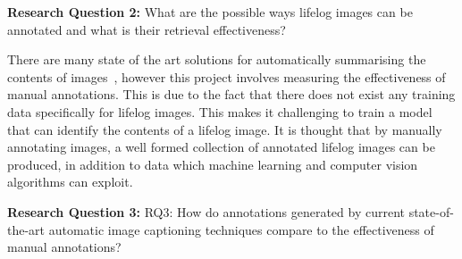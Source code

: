 \textbf{Research Question 2:} What are the possible ways lifelog images can be annotated and what is their retrieval effectiveness?

There are many state of the art solutions for automatically summarising the contents of images~\cite{karpathy2015deep}\cite{jia2014caffe}\cite{pan2004gcap}, however this project involves measuring the effectiveness of manual annotations. This is due to the fact that there does not exist any training data specifically for lifelog images. This makes it challenging to train a model that can identify the contents of a lifelog image. It is thought that by manually annotating images, a well formed collection of annotated lifelog images can be produced, in addition to data which machine learning and computer vision algorithms can exploit.

\textbf{Research Question 3:} RQ3: How do annotations generated by current state-of-the-art automatic image captioning techniques compare to the effectiveness of manual annotations?

